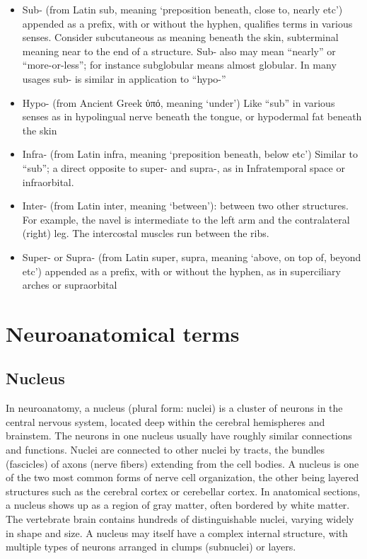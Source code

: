 \begin{itemize}
\tightlist
\item
  Sub- (from Latin sub, meaning `preposition beneath, close to, nearly etc') appended as a prefix, with or without the hyphen, qualifies terms in various senses. Consider subcutaneous as meaning beneath the skin, subterminal meaning near to the end of a structure. Sub- also may mean ``nearly'' or ``more-or-less''; for instance subglobular means almost globular. In many usages sub- is similar in application to ``hypo-''
\item
  Hypo- (from Ancient Greek ὑπό, meaning `under') Like ``sub'' in various senses as in hypolingual nerve beneath the tongue, or hypodermal fat beneath the skin
\item
  Infra- (from Latin infra, meaning `preposition beneath, below etc') Similar to ``sub''; a direct opposite to super- and supra-, as in Infratemporal space or infraorbital.
\item
  Inter- (from Latin inter, meaning `between'): between two other structures. For example, the navel is intermediate to the left arm and the contralateral (right) leg. The intercostal muscles run between the ribs.
\item
  Super- or Supra- (from Latin super, supra, meaning `above, on top of, beyond etc') appended as a prefix, with or without the hyphen, as in superciliary arches or supraorbital
\end{itemize}

\hypertarget{neuroanatomical-terms}{%
\chapter{Neuroanatomical terms}\label{neuroanatomical-terms}}

\hypertarget{nucleus}{%
\section{Nucleus}\label{nucleus}}

In neuroanatomy, a nucleus (plural form: nuclei) is a cluster of neurons in the central nervous system, located deep within the cerebral hemispheres and brainstem. The neurons in one nucleus usually have roughly similar connections and functions. Nuclei are connected to other nuclei by tracts, the bundles (fascicles) of axons (nerve fibers) extending from the cell bodies. A nucleus is one of the two most common forms of nerve cell organization, the other being layered structures such as the cerebral cortex or cerebellar cortex. In anatomical sections, a nucleus shows up as a region of gray matter, often bordered by white matter. The vertebrate brain contains hundreds of distinguishable nuclei, varying widely in shape and size. A nucleus may itself have a complex internal structure, with multiple types of neurons arranged in clumps (subnuclei) or layers.

